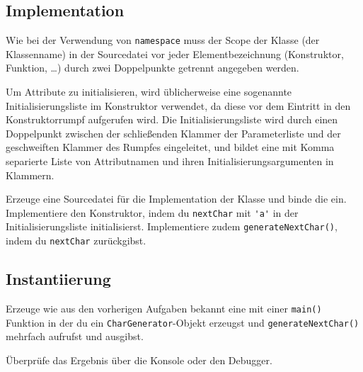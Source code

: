 \subsection{Implementation}
Wie bei der Verwendung von \lstinline{namespace} muss der Scope der Klasse (der Klassenname) in der Sourcedatei vor jeder Elementbezeichnung (Konstruktor, Funktion, \dots) durch zwei Doppelpunkte getrennt angegeben werden.



Um Attribute zu initialisieren, wird üblicherweise eine sogenannte Initialisierungsliste im Konstruktor verwendet, da diese vor dem Eintritt in den Konstruktorrumpf aufgerufen wird.
Die Initialisierungsliste wird durch einen Doppelpunkt zwischen der schließenden Klammer der Parameterliste und der geschweiften Klammer des Rumpfes eingeleitet, und bildet eine mit Komma separierte Liste von Attributnamen und ihren Initialisierungsargumenten in Klammern.



Erzeuge eine Sourcedatei  für die Implementation der Klasse und binde die  ein.
Implementiere den Konstruktor, indem du \lstinline{nextChar} mit \lstinline{'a'} in der Initialisierungsliste initialisierst.
Implementiere zudem \lstinline{generateNextChar()}, indem du \lstinline{nextChar} zurückgibst.


\subsection{Instantiierung}
Erzeuge wie aus den vorherigen Aufgaben bekannt eine  mit einer \lstinline{main()} Funktion in der du ein \lstinline{CharGenerator}-Objekt erzeugst und \lstinline{generateNextChar()} mehrfach aufrufst und ausgibst.



Überprüfe das Ergebnis über die Konsole oder den Debugger.


